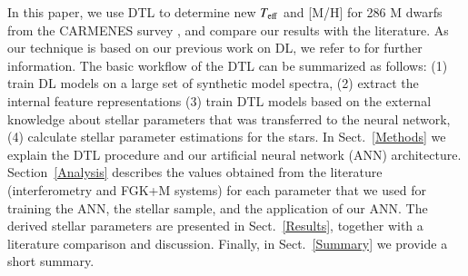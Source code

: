 \documentclass{aa}
\begin{document}
In this paper, we use DTL to determine new $T_{\rm eff}$ and [M/H] for 286 M dwarfs from the 
CARMENES survey \citep{Reiners2018a,Quirrenbach2020}, and compare our results with the literature. As our technique is based on our previous work on DL, we refer to \cite{Passegger2020} for further information.
The basic workflow of the DTL can be summarized as follows: (1) train DL models on a large set of synthetic model spectra, (2) extract the internal feature representations (3) train DTL models based on the external knowledge about stellar parameters that was transferred to the neural network, (4) calculate stellar parameter estimations for the stars.
In Sect.~\ref{Methods} we explain the DTL procedure and our artificial neural network (ANN) architecture. 
Section~\ref{Analysis} describes the values obtained from the literature (interferometry and FGK+M systems) for each parameter that we used for training the ANN, the stellar sample, and the application of our ANN. 
The derived stellar parameters are presented in Sect.~\ref{Results}, together with a literature comparison and discussion. 
Finally, in Sect.~\ref{Summary} we provide a short summary. 

\end{document}
